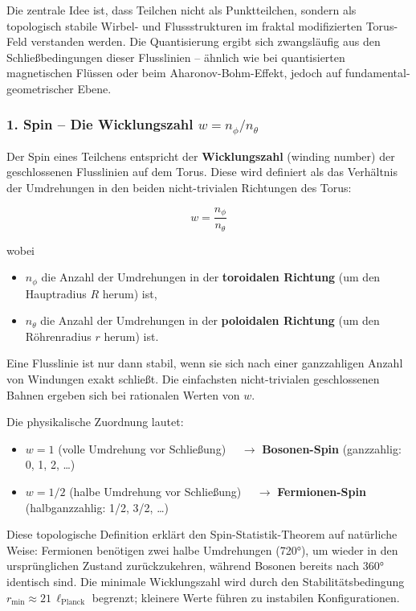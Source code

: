 	Die zentrale Idee ist, dass Teilchen nicht als Punktteilchen, sondern als topologisch stabile Wirbel- und Flussstrukturen im fraktal modifizierten Torus-Feld verstanden werden. Die Quantisierung ergibt sich zwangsläufig aus den Schließbedingungen dieser Flusslinien – ähnlich wie bei quantisierten magnetischen Flüssen oder beim Aharonov-Bohm-Effekt, jedoch auf fundamental-geometrischer Ebene.
	
	\subsubsection{1. Spin – Die Wicklungszahl $w = n_\phi / n_\theta$}
	
	Der Spin eines Teilchens entspricht der \textbf{Wicklungszahl} (winding number) der geschlossenen Flusslinien auf dem Torus. Diese wird definiert als das Verhältnis der Umdrehungen in den beiden nicht-trivialen Richtungen des Torus:
	
	\begin{equation}
		w = \frac{n_\phi}{n_\theta}
		\label{eq:winding_number}
	\end{equation}
	
	wobei
	\begin{itemize}
		\item $n_\phi$ die Anzahl der Umdrehungen in der \textbf{toroidalen Richtung} (um den Hauptradius $R$ herum) ist,
		\item $n_\theta$ die Anzahl der Umdrehungen in der \textbf{poloidalen Richtung} (um den Röhrenradius $r$ herum) ist.
	\end{itemize}
	
	Eine Flusslinie ist nur dann stabil, wenn sie sich nach einer ganzzahligen Anzahl von Windungen exakt schließt. Die einfachsten nicht-trivialen geschlossenen Bahnen ergeben sich bei rationalen Werten von $w$.
	
	Die physikalische Zuordnung lautet:
	\begin{itemize}
		\item $w = 1$ \quad (volle Umdrehung vor Schließung) $\quad \to$ \textbf{Bosonen-Spin} (ganzzahlig: 0, 1, 2, …)
		\item $w = 1/2$ \quad (halbe Umdrehung vor Schließung) $\quad \to$ \textbf{Fermionen-Spin} (halbganzzahlig: 1/2, 3/2, …)
	\end{itemize}
	
	Diese topologische Definition erklärt den Spin-Statistik-Theorem auf natürliche Weise: Fermionen benötigen zwei halbe Umdrehungen (720°), um wieder in den ursprünglichen Zustand zurückzukehren, während Bosonen bereits nach 360° identisch sind. Die minimale Wicklungszahl wird durch den Stabilitätsbedingung $r_{\min} \approx 21 \, \ell_{\text{Planck}}$ begrenzt; kleinere Werte führen zu instabilen Konfigurationen.
	
